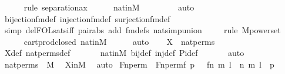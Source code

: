 \begin{isabellebody}
\ \ \ \ \ \isamarkupfalse%
{\isacharparenleft}{\kern0pt}rule\ separation{\isacharunderscore}{\kern0pt}ax{\isacharparenright}{\kern0pt}\isanewline
\ \ \ \ \isamarkupfalse%
\ nat{\isacharunderscore}{\kern0pt}in{\isacharunderscore}{\kern0pt}M\isanewline
\ \ \ \ \ \ \ \isamarkupfalse%
\ auto{\isacharbrackleft}{\kern0pt}{}{\isacharbrackright}{\kern0pt}\isanewline
\ \ \ \ \isamarkupfalse%
\ bijection{\isacharunderscore}{\kern0pt}fm{\isacharunderscore}{\kern0pt}def\ injection{\isacharunderscore}{\kern0pt}fm{\isacharunderscore}{\kern0pt}def\ surjection{\isacharunderscore}{\kern0pt}fm{\isacharunderscore}{\kern0pt}def\isanewline
\ \ \ \ \ \isamarkupfalse%
\ {\isacharparenleft}{\kern0pt}simp\ del{\isacharcolon}{\kern0pt}FOL{\isacharunderscore}{\kern0pt}sats{\isacharunderscore}{\kern0pt}iff\ pair{\isacharunderscore}{\kern0pt}abs\ add{\isacharcolon}{\kern0pt}\ fm{\isacharunderscore}{\kern0pt}defs\ nat{\isacharunderscore}{\kern0pt}simp{\isacharunderscore}{\kern0pt}union{\isacharparenright}{\kern0pt}\isanewline
\ \ \ \ \isamarkupfalse%
{\isacharparenleft}{\kern0pt}rule\ M{\isacharunderscore}{\kern0pt}powerset{\isacharparenright}{\kern0pt}\isanewline
\ \ \ \ \isamarkupfalse%
\ cartprod{\isacharunderscore}{\kern0pt}closed\ nat{\isacharunderscore}{\kern0pt}in{\isacharunderscore}{\kern0pt}M\isanewline
\ \ \ \ \isamarkupfalse%
\ auto\isanewline
\isanewline
\ \ \isamarkupfalse%
\ {\isachardoublequoteopen}X\ {\isacharequal}{\kern0pt}\ nat{\isacharunderscore}{\kern0pt}perms{\isachardoublequoteclose}\isanewline
\ \ \ \ \isamarkupfalse%
\ X{\isacharunderscore}{\kern0pt}def\ nat{\isacharunderscore}{\kern0pt}perms{\isacharunderscore}{\kern0pt}def\ \isanewline
\ \ \ \ \isamarkupfalse%
\ nat{\isacharunderscore}{\kern0pt}in{\isacharunderscore}{\kern0pt}M\ bij{\isacharunderscore}{\kern0pt}def\ inj{\isacharunderscore}{\kern0pt}def\ Pi{\isacharunderscore}{\kern0pt}def\ \isanewline
\ \ \ \ \isamarkupfalse%
\ auto\isanewline
\ \ \isamarkupfalse%
\ \isamarkupfalse%
\ {\isachardoublequoteopen}nat{\isacharunderscore}{\kern0pt}perms\ {\isasymin}\ M{\isachardoublequoteclose}\ \isamarkupfalse%
\ XinM\ \isamarkupfalse%
\ auto\isanewline
{}\isamarkupfalse%
%
\endisatagproof
{\isafoldproof}%
%
\isadelimproof
\isanewline
%
\endisadelimproof
\isanewline
{}\isamarkupfalse%
\ Fn{\isacharunderscore}{\kern0pt}perm\ \ {\isachardoublequoteopen}Fn{\isacharunderscore}{\kern0pt}perm{\isacharparenleft}{\kern0pt}f{\isacharcomma}{\kern0pt}\ p{\isacharparenright}{\kern0pt}\ {\isasymequiv}\ {\isacharbraceleft}{\kern0pt}\ {\isacharless}{\kern0pt}{\isacharless}{\kern0pt}f{\isacharbackquote}{\kern0pt}n{\isacharcomma}{\kern0pt}\ m{\isachargreater}{\kern0pt}{\isacharcomma}{\kern0pt}\ l{\isachargreater}{\kern0pt}\ {\isachardot}{\kern0pt}\ {\isacharless}{\kern0pt}{\isacharless}{\kern0pt}n{\isacharcomma}{\kern0pt}\ m{\isachargreater}{\kern0pt}{\isacharcomma}{\kern0pt}\ l{\isachargreater}{\kern0pt}\ {\isasymin}\ p\ {\isacharbraceright}{\kern0pt}{\isachardoublequoteclose}\ \isanewline

\end{isabellebody}

